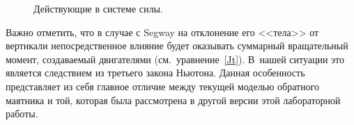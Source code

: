 \documentclass[12pt,a4paper,openany]{extarticle}
\begin{document}
\begin{figure}[h]
	\noindent{}
	\caption{Действующие в системе силы.}
	\label{forces}
\end{figure}

Важно отметить, что в случае с Segway на отклонение его <<тела>> от вертикали непосредственное влияние будет оказывать суммарный вращательный момент, создаваемый двигателями (см.~уравнение~\eqref{Jt}).
В~нашей ситуации это является следствием из третьего закона Ньютона.
Данная особенность представляет из себя главное отличие между текущей моделью обратного маятника и той, которая была рассмотрена в другой версии этой лабораторной работы.
\end{document}
